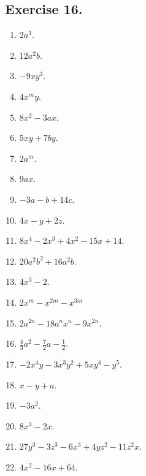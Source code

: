 \documentclass{book}
\begin{document}
\subsection*{Exercise 16.}

\begin{enumerate}
\item $2a^3$.

\item $12a^2b$.

\item $-9xy^3$.

\item $4x^my$.

\item $8x^2 - 3ax$.

\item $5xy + 7by$.

\item $2a^m$.

\item $9 ax$.

\item $-3a - b + 14c$.

\item $4x - y + 2z$.

\item $8x^4 - 2x^3 + 4x^2 - 15x + 14$.

\item $20a^2b^2 + 16a^2b$.

\item $4x^3 - 2$.

\item $2x^m - x^{2m} - x^{3m}$

\item $2a^{2n} - 18a^nx^n - 9x^{2n}$.

\item $\frac{4}{3}a^2 - \frac{7}{2}a - \frac{1}{2}$.

\item $-2x^4y - 3x^3y^2 + 5xy^4 - y^5$.

\item $x - y + a$.

\item $-3a^2$.

\item $8x^3 - 2x$.

\item $27y^3 - 3z^3 - 6x^3 + 4yz^2 - 11z^2x$.

\item $4x^2 - 16x + 64$.


\end{enumerate}
\end{document}
